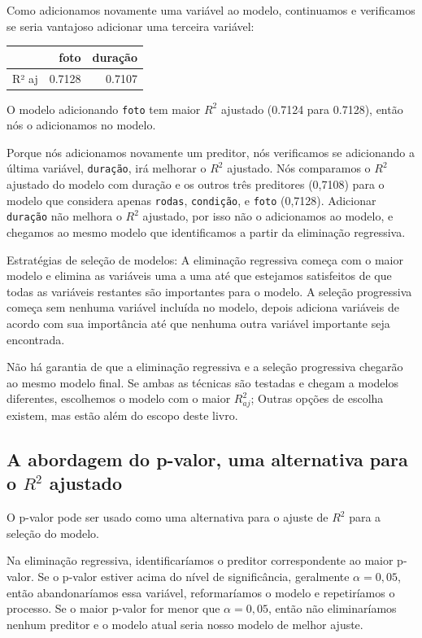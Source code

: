 \documentclass[
]{book}
\theoremstyle{definition}
\theoremstyle{definition}
\theoremstyle{definition}
\theoremstyle{definition}
\theoremstyle{remark}
\begin{document}
Como adicionamos novamente uma variável ao modelo, continuamos e verificamos se seria vantajoso adicionar uma terceira variável:

\begin{tabular}{l|r|r}
\hline
  & foto & duração\\
\hline
R² aj & 0.7128 & 0.7107\\
\hline
\end{tabular}

O modelo adicionando \texttt{foto} tem maior \(R^2\) ajustado (0.7124 para 0.7128), então nós o adicionamos no modelo.

Porque nós adicionamos novamente um preditor, nós verificamos se adicionando a última variável, \texttt{duração}, irá melhorar o \(R^2\) ajustado. Nós comparamos o \(R^2\) ajustado do modelo com duração e os outros três preditores (0,7108) para o modelo que considera apenas \texttt{rodas}, \texttt{condição}, e \texttt{foto} (0,7128). Adicionar \texttt{duração} não melhora o \(R^2\) ajustado, por isso não o adicionamos ao modelo, e chegamos ao mesmo modelo que identificamos a partir da eliminação regressiva.

Estratégias de seleção de modelos: A eliminação regressiva começa com o maior modelo e elimina as variáveis uma a uma até que estejamos satisfeitos de que todas as variáveis restantes são importantes para o modelo. A seleção progressiva começa sem nenhuma variável incluída no modelo, depois adiciona variáveis de acordo com sua importância até que nenhuma outra variável importante seja encontrada.

Não há garantia de que a eliminação regressiva e a seleção progressiva chegarão ao mesmo modelo final. Se ambas as técnicas são testadas e chegam a modelos diferentes, escolhemos o modelo com o maior \(R_{aj}^2\); Outras opções de escolha existem, mas estão além do escopo deste livro.

\hypertarget{pValueAlternativeToR2adj}{%
\subsection{\texorpdfstring{A abordagem do p-valor, uma alternativa para o \(R^2\) ajustado}{A abordagem do p-valor, uma alternativa para o R\^{}2 ajustado}}\label{pValueAlternativeToR2adj}}

O p-valor pode ser usado como uma alternativa para o ajuste de \(R^2\) para a seleção do modelo.

Na eliminação regressiva, identificaríamos o preditor correspondente ao maior p-valor. Se o p-valor estiver acima do nível de significância, geralmente \(\alpha = 0,05\), então abandonaríamos essa variável, reformaríamos o modelo e repetiríamos o processo. Se o maior p-valor for menor que \(\alpha = 0,05\), então não eliminaríamos nenhum preditor e o modelo atual seria nosso modelo de melhor ajuste.
\end{document}
